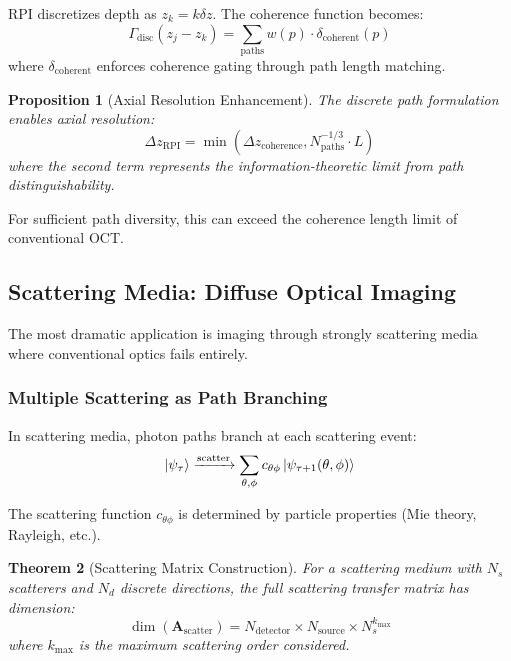 \documentclass[twocolumn,10pt,a4paper]{article}
\newtheorem{theorem}{Theorem}[section]
\newtheorem{proposition}[theorem]{Proposition}
\begin{document}
RPI discretizes depth as $z_k = k\delta z$. The coherence function becomes:
\begin{equation}
\Gamma_{\text{disc}}(z_j - z_k) = \sum_{\text{paths}} w(p) \cdot \delta_{\text{coherent}}(p)
\end{equation}
where $\delta_{\text{coherent}}$ enforces coherence gating through path length matching.

\begin{proposition}[Axial Resolution Enhancement]
The discrete path formulation enables axial resolution:
\begin{equation}
\Delta z_{\text{RPI}} = \min\left(\Delta z_{\text{coherence}}, N_{\text{paths}}^{-1/3} \cdot L\right)
\end{equation}
where the second term represents the information-theoretic limit from path distinguishability.
\end{proposition}

For sufficient path diversity, this can exceed the coherence length limit of conventional OCT.

\subsection{Scattering Media: Diffuse Optical Imaging}

The most dramatic application is imaging through strongly scattering media where conventional optics fails entirely.

\subsubsection{Multiple Scattering as Path Branching}

In scattering media, photon paths branch at each scattering event:
\begin{equation}
\ket{\psi_\tau} \xrightarrow{\text{scatter}} \sum_{\theta,\phi} c_{\theta\phi} \ket{\psi_{\tau+1}(\theta,\phi)}
\end{equation}

The scattering function $c_{\theta\phi}$ is determined by particle properties (Mie theory, Rayleigh, etc.).

\begin{theorem}[Scattering Matrix Construction]
For a scattering medium with $N_s$ scatterers and $N_d$ discrete directions, the full scattering transfer matrix has dimension:
\begin{equation}
\dim(\mathbf{A}_{\text{scatter}}) = N_{\text{detector}} \times N_{\text{source}} \times N_s^{k_{\max}}
\end{equation}
where $k_{\max}$ is the maximum scattering order considered.
\end{theorem}
\end{document}
